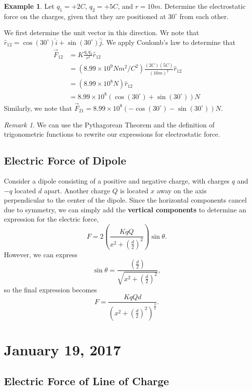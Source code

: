 \documentclass[11pt]{article}
\theoremstyle{plain} %
\theoremstyle{definition}
\theoremstyle{example}
\newtheorem*{example}{Example}
\theoremstyle{remark}
\newtheorem*{remark}{Remark}
\begin{document}
\begin{example}
Let $q_1 = +2C$, $q_2 = +5C$, and $r=10m$. Determine the electrostatic force on the charges, given that they are positioned at $30^{\circ}$ from each other. 
\end{example}

We first determine the unit vector in this direction. Wr note that $\hat{r}_{12} = \cos\left(30^{\circ}\right)\hat{i} + \sin\left(30^{\circ}\right)\hat{j}$. We apply Coulomb's law to determine that 
\begin{align*}
	\vec{F}_{12} &= K\frac{q_1q_2}{r^2}\hat{r}_{12}\\
	&= \left(8.99\times10^9Nm^2/C^2\right)\frac{(2C)(5C)}{(10m)^2}\hat{r}_{12}\\
	&= \left(8.99\times10^8N\right)\hat{r}_{12}\\
	&= 8.99\times10^8\left(\cos\left(30^{\circ}\right)+\sin\left(30^{\circ}\right)\right)N
\end{align*}
Similarly, we note that $\vec{F}_{21} = 8.99\times10^8\left(-\cos\left(30^{\circ}\right)-\sin\left(30^{\circ}\right)\right)N$.

\begin{remark}
We can use the Pythagorean Theorem and the definition of trigonometric functions to rewrite our expressions for electrostatic force. 
\end{remark}

\subsection{Electric Force of Dipole}

Consider a dipole consisting of a positive and negative charge, with charges $q$ and $-q$ located $d$ apart. Another charge $Q$ is located $x$ away on the axis perpendicular to the center of the dipole. Since the horizontal components cancel due to symmetry, we can simply add the \textbf{vertical components} to determine an expression for the electric force,
$$F = 2\left(\frac{KqQ}{x^2+\left(\frac{d}{2}\right)^2}\right)\sin\theta.$$
However, we can express $$\sin\theta = \frac{\left(\frac{d}{2}\right)}{\sqrt{x^2+\left(\frac{d}{2}\right)^2}},$$
so the final expression becomes 
$$F = \frac{KqQd}{\left(x^2+\left(\frac{d}{2}\right)^2\right)^{\frac{3}{2}}}.$$


\section{January 19, 2017}
\subsection{Electric Force of Line of Charge}
\end{document}
